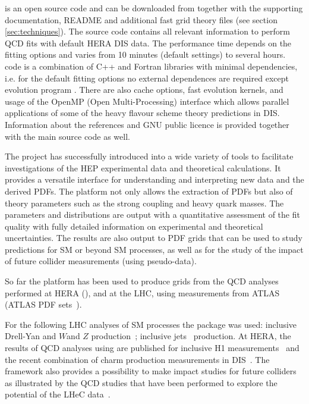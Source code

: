
\fitter is an open source code and can be downloaded from \cite{herafitter:page}
together with the supporting documentation, README and additional fast grid theory files 
(see section \ref{sec:techniques}). 
The source code contains all relevant information to perform QCD fits with default 
HERA DIS data. The performance time depends on the fitting options and varies from 10 minutes 
(default settings) to several hours.
\fitter code is a combination of C++ and Fortran libraries with minimal 
dependencies, i.e. for the default fitting options no external dependences are required 
except \qcdnum evolution program \cite{qcdnum}. 
There are also cache options, fast evolution kernels, and usage of the OpenMP (Open Multi-Processing) 
interface which allows parallel applications of some of the heavy flavour scheme theory predictions in DIS. 
Information about the references and GNU public licence is provided 
together with the main source code as well. 

The \fitter project has successfully introduced into a wide variety
of tools to facilitate investigations of the HEP experimental data
and theoretical calculations. It provides a versatile interface
for understanding and interpreting new data and the derived PDFs.
The \fitter platform not only allows the extraction of PDFs but also of theory 
parameters such as the strong coupling and heavy quark masses. The parameters and distributions are output with a
quantitative assessment of the fit quality with fully detailed information on 
experimental and theoretical uncertainties.
The results are also output to PDF \lhapdf grids that can be used to study predictions for 
SM or beyond SM processes, as well as for the study of the impact of 
future collider measurements (using pseudo-data).

So far the \fitter platform has been used to produce grids 
from the QCD analyses performed at 
HERA (\cite{h1zeus:2009wt}), and at the LHC, using 
measurements from ATLAS~\cite{atlas:strange,atlas:jets} (ATLAS PDF sets~\cite{atlas:grids}).

For the following LHC analyses of SM processes 
the \fitter package was used:
inclusive Drell-Yan and $W$and $Z$ 
production~\cite{atlas:strange,atlas:hm,cms:strange};
inclusive jets~\cite{atlas:jets,cms:jets} production.
At HERA, the results of QCD analyses using \fitter are 
published for inclusive H1 measurements~\cite{h1:2012kk}
and the recent combination of charm production measurements 
in DIS~\cite{h1zeus:charm}.
The \fitter framework also provides a possibility to 
make impact studies for future colliders
as illustrated by the QCD studies that have been performed to 
explore the potential of the LHeC data~\cite{lhec:studies}.

